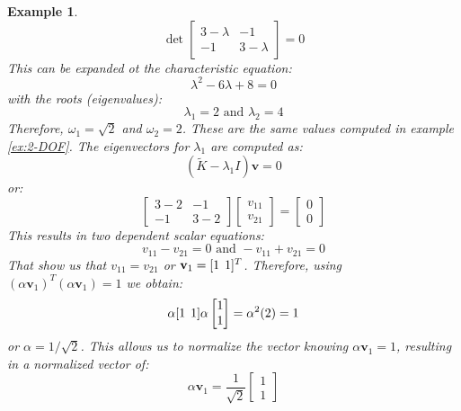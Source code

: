 \documentclass[12pt,letter]{article}
\newtheorem{ex}{Example}
\numberwithin{ex}{section} %
\newenvironment{example}{\begin{mdframed}[middlelinewidth=0.5mm]\begin{ex}\normalfont}{\end{ex}\end{mdframed}}
\numberwithin{re}{section} %
\begin{document}
\begin{example}
\begin{equation}
\det \begin{bmatrix} 3-\lambda & -1 \\    -1  & 3-\lambda \end{bmatrix}  =  0
\end{equation}
This can be expanded ot the characteristic equation:
\begin{equation}
\lambda^2 -6\lambda + 8  =  0
\end{equation}
with the roots (eigenvalues):
\begin{equation}
\lambda_1 = 2\text{ and } \lambda_2 = 4
\end{equation}
Therefore, $\omega_1=\sqrt{2}$ and $\omega_2=2$. These are the same values computed in example \ref{ex:2-DOF}. The eigenvectors for $\lambda_1$ are computed as:
\begin{equation}
(\widetilde{K} - \lambda_1 I)\textbf{v} =  0
\end{equation}
or:
\begin{equation}
\begin{bmatrix} 3-2 & -1 \\    -1  & 3-2 \end{bmatrix} \begin{bmatrix} v_{11} \\ v_{21}  \end{bmatrix} =  \begin{bmatrix} 0 \\ 0  \end{bmatrix}
\end{equation}
This results in two dependent scalar equations:
\begin{equation}
v_{11} - v_{21} = 0 \text{ and } -v_{11} + v_{21} =0
\end{equation}
That show us that $v_{11} = v_{21}$ or $\textbf{v}_1=[1 \hspace{1ex} 1]^T$. Therefore, using $(\alpha \textbf{v}_1)^T(\alpha \textbf{v}_1) = 1$ we obtain:
\begin{equation}
\alpha [1 \hspace{1ex} 1]\alpha  \begin{bmatrix} 1 \\  1 \end{bmatrix}  = \alpha^2(2) = 1
\end{equation}
or $\alpha = 1/\sqrt{2}$. This allows us to normalize the vector knowing $\alpha \textbf{v}_1=1$, resulting in a normalized vector of:
\begin{equation}
\alpha \textbf{v}_1=  \frac{1}{\sqrt{2}} \begin{bmatrix} 1 \\ 1 \end{bmatrix} 

\end{equation}
\end{example}
\end{document}
